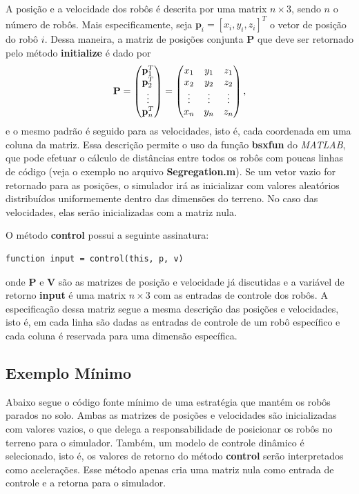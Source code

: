 \documentclass[11pt,a4paper]{article}
\begin{document}
A posição e a velocidade dos robôs é descrita por uma matrix $n \times
3$, sendo $n$ o número de robôs. Mais especificamente, seja
$\mathbf{p}_i = [x_i, y_i, z_i]^T$ o vetor de posição do robô
$i$. Dessa maneira, a matriz de posições conjunta $\mathbf{P}$ que deve
ser retornado pelo método \textbf{initialize} é dado por
\begin{equation}
  \mathbf{P} = 
 \begin{pmatrix}
    \mathbf{p}_1^T \cr
    \mathbf{p}_2^T \cr
    \vdots \cr
    \mathbf{p}_n^T
  \end{pmatrix}
  =
  \begin{pmatrix}
    x_1 & y_1 & z_1 \cr
    x_2 & y_2 & z_2 \cr
    \vdots & \vdots & \vdots \cr
    x_n & y_n & z_n
  \end{pmatrix},
\end{equation}
e o mesmo padrão é seguido para as velocidades, isto é, cada
coordenada em uma coluna da matriz. Essa descrição permite o uso da
função \textbf{bsxfun} do \textit{MATLAB}, que pode efetuar o cálculo
de distâncias entre todos os robôs com poucas linhas de código (veja o
exemplo no arquivo \textbf{Segregation.m}). Se um vetor vazio for
retornado para as posições, o simulador irá as inicializar com valores
aleatórios distribuídos uniformemente dentro das dimensões do
terreno. No caso das velocidades, elas serão inicializadas com a
matriz nula.

O método \textbf{control} possui a seguinte assinatura:
\begin{lstlisting}
function input = control(this, p, v)
\end{lstlisting}
onde $\mathbf{P}$ e $\mathbf{V}$ são as matrizes de posição e
velocidade já discutidas e a variável de retorno
\textbf{input} é uma matrix $n \times 3$ com as entradas de controle
dos robôs. A especificação dessa matriz segue a mesma descrição das
posições e velocidades, isto é, em cada linha são dadas as entradas de
controle de um robô específico e cada coluna é reservada para uma
dimensão específica.

\subsection{Exemplo Mínimo}

Abaixo segue o código fonte mínimo de uma estratégia que mantém os
robôs parados no solo. Ambas as matrizes de posições e velocidades são
inicializadas com valores vazios, o que delega a responsabilidade de
posicionar os robôs no terreno para o simulador. Também, um modelo de
controle dinâmico é selecionado, isto é, os valores de retorno do
método \textbf{control} serão interpretados como acelerações. Esse
método apenas cria uma matriz nula como entrada de controle e a
retorna para o simulador.
\end{document}
